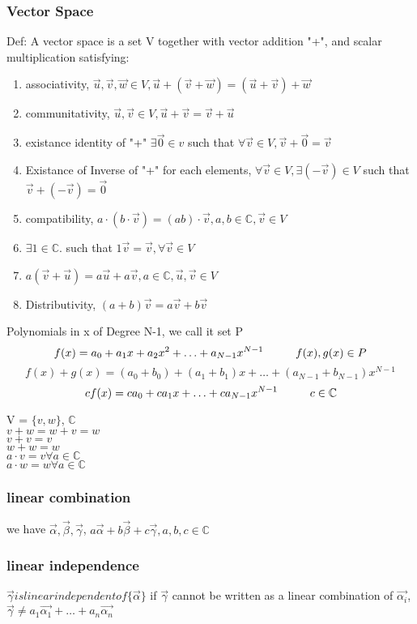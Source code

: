 \documentclass[12pt, a4paper]{article}
\newcommand{\tab}[1][1cm]{\hspace*{#1}}
\begin{document}
\subsubsection{Vector Space}
Def: A vector space is a set V together with vector addition "+", and scalar multiplication satisfying:
\begin{enumerate}
\item associativity, $\vec{u},\vec{v},\vec{w}\in V, \vec{u}+(\vec{v}+\vec{w})=(\vec{u}+\vec{v})+\vec{w}$
\item communitativity, $\vec{u}, \vec{v} \in V, \vec{u} + \vec{v}=\vec{v}+\vec{u}$
\item existance identity of "+" $\exists \vec{0} \in v$ such that $\forall \vec{v} \in V, \vec{v}+\vec{0}=\vec{v}$
\item Existance of Inverse of "+" for each elements, $\forall \vec{v}\in V, \exists (-\vec{v})\in V$ such that $\vec{v}+(-\vec{v})=\vec{0}$
\item compatibility, $a\cdot (b\cdot \vec{v})=(ab)\cdot \vec{v}, a,b\in \mathbb{C}, \vec{v} \in V$
\item $\exists 1 \in \mathbb{C}. $ such that $1\vec{v}=\vec{v},\forall \vec{v}\in V$
\item $a(\vec{v}+\vec{u})=a\vec{u}+a\vec{v}, a \in \mathbb{C}, \vec{u}, \vec{v} \in V$
\item Distributivity, $(a+b)\vec{v}=a\vec{v}+b\vec{v}$
\end{enumerate}
Polynomials in x of Degree N-1, we call it set P
$$f(x)=a_0+a_1x+a_2x^2+\hdots+a_{N-1}x^{N-1}\tab f(x),g(x)\in P$$
$$f(x)+g(x)=(a_0+b_0)+(a_1+b_1)x+\hdots+(a_{N-1}+b_{N-1})x^{N-1}$$
$$cf(x)=ca_0+ca_1x+\hdots+ca_{N-1}x^{N-1}\tab c\in \mathbb{C}$$

V = $\{v,w\}$, $\mathbb{C}$\\
$v+w=w+v=w$\\
$v+v=v$\\
$w+w=w$\\
$a\cdot v=v \forall a\in \mathbb{C}$\\
$a\cdot w=w \forall a\in \mathbb{C}$ 


\subsubsection{linear combination}
we have $\vec{\alpha},\vec{\beta},\vec{\gamma}$, $a\vec{\alpha}+b\vec{\beta}+c\vec{\gamma}, a,b,c\in \mathbb{C}$ 

\subsubsection{linear independence}
$\vec{\gamma} is linear independent of \{\vec{\alpha}\}$ if $\vec{\gamma}$ cannot be written as a linear combination of $\vec{\alpha_i}$, $\vec{\gamma}\not = a_1\vec{\alpha_1}+\hdots+a_n\vec{\alpha_n}$
\end{document}
